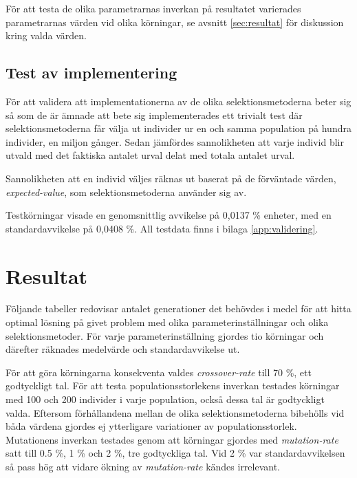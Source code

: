 \documentclass[titlepage, a4paper, 12pt]{article}
\begin{document}
För att testa de olika parametrarnas inverkan på resultatet varierades
parametrarnas värden vid olika körningar, se avsnitt
\vref{sec:resultat} för diskussion kring valda värden.

\subsection{Test av implementering}
För att validera att implementationerna av de olika
selektionsmetoderna beter sig så som de är ämnade att bete sig
implementerades ett trivialt test där selektionsmetoderna får välja ut
individer ur en och samma population på hundra individer, en miljon
gånger. Sedan jämfördes sannolikheten att varje individ blir utvald
med det faktiska antalet urval delat med totala antalet urval.

Sannolikheten att en individ väljes räknas ut baserat på de förväntade
värden, \textit{expected-value}, som selektionsmetoderna använder sig
av.

Testkörningar visade en genomsnittlig avvikelse på 0,0137 \% enheter,
med en standardavvikelse på 0,0408 \%. All testdata finns i bilaga
\ref{app:validering}.

\section{Resultat}\label{sec:resultat}
Följande tabeller redovisar antalet generationer det behövdes i medel
för att hitta optimal lösning på givet problem med olika
parameterinställningar och olika selektionsmetoder. För varje
parameterinställning gjordes tio körningar och därefter räknades
medelvärde och standardavvikelse ut.

För att göra körningarna konsekventa valdes \textit{crossover-rate}
till 70 \%, ett godtyckligt tal. För att testa populationsstorlekens
inverkan testades körningar med 100 och 200 individer i varje
population, också dessa tal är godtyckligt valda. Eftersom
förhållandena mellan de olika selektionsmetoderna bibehölls vid båda
värdena gjordes ej ytterligare variationer av
populations\-storlek. Mutationens inverkan testades genom att
körningar gjordes med \textit{mutation-rate} satt till 0.5 \%, 1 \%
och 2 \%, tre godtyckliga tal. Vid 2 \% var standardavvikelsen så pass
hög att vidare ökning av \textit{mutation-rate} kändes irrelevant.
\end{document}
